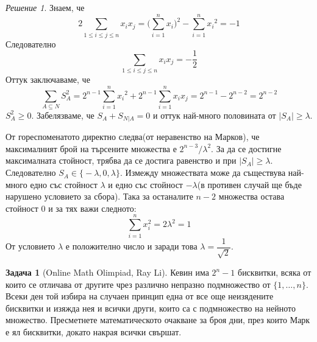 \documentclass[11 pt, a4paper]{article}
\theoremstyle{definition}
\newtheorem{p}{Задача}
\theoremstyle{remark}
\newtheorem*{s}{Решение}
\begin{document}
\begin{s}Знаем, че
\begin{equation*}
2\sum_{1\leq i\leq j\leq n}x_i x_j=\bigg(\sum_{i=1}^{n}x_i\bigg)^2-\sum_{i=1}^{n}{x_i}^2=-1
\end{equation*}
Следователно
\begin{equation*}
\sum_{1\leq i\leq j\leq n}x_i x_j=-\dfrac{1}{2}
\end{equation*}
Оттук заключаваме, че 
\begin{equation*}
\sum_{A\subseteq N}{S_A^2}=2^{n-1}\sum_{i=1}^{n}{x_i}^2+2^{n-1}\sum_{i=1}^{n}x_i x_j=2^{n-1}-2^{n-2}=2^{n-2}
\end{equation*}
$S_A^2\geq0$. Забелязваме, че $S_A+S_{N|A}=0$ и оттук най-много половината от $\left|S_A\right|\geq\lambda$.\par
От гореспоменатото директно следва(от неравенство на Марков), че максималният брой на търсените множества е $2^{n-3}/\lambda^2$. За да се достигне максималната стойност, трябва да се достига равенство и при $\left|S_A\right|\geq\lambda$. Следователно $S_A\in \big\{-\lambda,0,\lambda \big\}$. Измежду множествата може да съществува най-много едно със стойност $\lambda$ и едно със стойност $-\lambda$(в противен случай ще бъде нарушено условието за сбора). Така за останалите $n-2$  множества остава стойност $0$ и за тях важи следното:
\begin{equation*}
\sum_{i=1}^{n}x_i^2=2\lambda^2=1
\end{equation*}
От условието $\lambda$ е положително число и заради това $\lambda=\dfrac{1}{\sqrt{2}}$.
\end{s}
\begin{p}[Online Math Olimpiad, Ray Li]
Кевин има $2^n-1$ бисквитки, всяка от които се отличава от другите чрез различно непразно подмножество от $\big\{1,\dots,n\big\}$. Всеки ден той избира на случаен принцип една от все още неизядените бисквитки и изяжда нея и всички други, които са с подмножество на нейното множество. Пресметнете математическото очакване за броя дни, през които Марк е ял бисквитки, докато накрая всички свършат.\par
\end{p}
\end{document}
